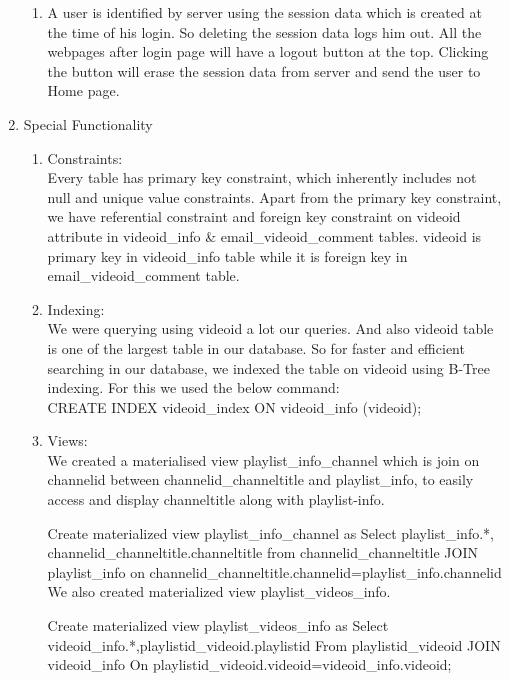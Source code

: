 \documentclass[10pt]{article}
\begin{document}
\begin{enumerate}
\begin{enumerate}
			\item A user is identified by server using the session data which is created at the time of his login. So deleting the session data logs him out. All the webpages after login page will have a logout button at the top. Clicking the button will erase the session data from server and send the user to Home page.
		\end{enumerate}
		\item Special Functionality
		\begin{enumerate}
			\item Constraints:\\
				Every table has primary key constraint, which inherently includes not null and unique value constraints. Apart from the primary key constraint, we have referential constraint and foreign key constraint on videoid attribute in videoid\_info \& email\_videoid\_comment tables. videoid is primary key in videoid\_info table while it is foreign key in email\_videoid\_comment table.
			\item Indexing:\\
				We were querying using videoid a lot our queries. And also videoid table is one of the largest table in our database. So for faster and efficient searching in our database, we indexed the table on videoid using B-Tree indexing. For this we used the below command:\\
				CREATE INDEX videoid\_index ON videoid\_info (videoid);
			\item Views:\\
				We created a materialised view playlist\_info\_channel which is join on channelid between channelid\_channeltitle and playlist\_info, to easily access and display channeltitle along with playlist-info.\par
				Create materialized view playlist\_info\_channel as
				Select playlist\_info.*, channelid\_channeltitle.channeltitle from channelid\_channeltitle JOIN playlist\_info on channelid\_channeltitle.channelid=playlist\_info.channelid\\
				We also created materialized view playlist\_videos\_info.\par
				Create materialized view playlist\_videos\_info as
				Select videoid\_info.*,playlistid\_videoid.playlistid
				From playlistid\_videoid JOIN videoid\_info
				On playlistid\_videoid.videoid=videoid\_info.videoid;\par
				

\end{enumerate}
\end{enumerate}
\end{document}

